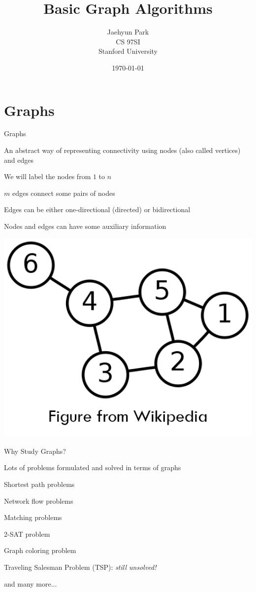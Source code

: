 \documentclass[13pt,onlymath]{beamer}
\title{\large \bfseries Basic Graph Algorithms}
\author{Jaehyun Park\\[3ex]
CS 97SI\\
Stanford University}
\date{\today}
\begin{document}
\frame{
\thispagestyle{empty}
\titlepage
}

\section{Graphs}

\begin{frame}{Graphs}
\BIT
\item An abstract way of representing connectivity using nodes (also called vertices) and edges
\item We will label the nodes from $1$ to $n$
\item $m$ edges connect some pairs of nodes
\BIT
\item Edges can be either one-directional (directed) or bidirectional
\EIT
\item Nodes and edges can have some auxiliary information
\EIT
\vfill
\begin{center}
\includegraphics[height=0.3\textheight]{figures/graph_example}
\end{center}
\end{frame}

\begin{frame}{Why Study Graphs?}
\BIT
\item Lots of problems formulated and solved in terms of graphs
\BIT
\item Shortest path problems
\item Network flow problems
\item Matching problems
\item 2-SAT problem
\item Graph coloring problem
\item Traveling Salesman Problem (TSP): \emph{still unsolved!}
\item and many more...
\EIT
\EIT
\end{frame}
\end{document}
